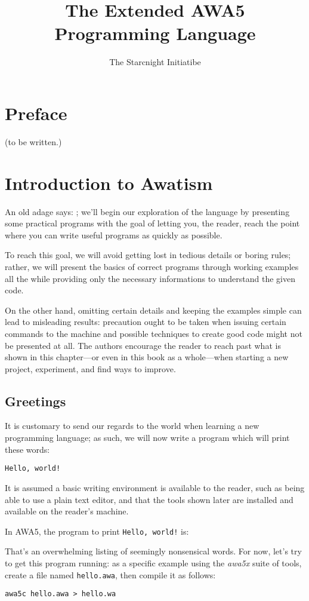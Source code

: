 \documentclass[11pt,a4paper,draft]{book}
\author{The Starcnight Initiatibe}
\title{The Extended AWA5 Programming Language}
\begin{document}
\frontmatter
\tableofcontents

\chapter{Preface}
(to be written.)

\mainmatter
\chapter{Introduction to Awatism}
An old adage says:
;
we'll begin our exploration of the language by presenting some
practical programs with the goal of letting you, the reader, reach the
point where you can write useful programs as quickly as possible.

To reach this goal, we will avoid getting lost in tedious details or
boring rules; rather, we will present the basics of correct programs
through working examples all the while providing only the necessary
informations to understand the given code.

On the other hand, omitting certain details and keeping the examples
simple can lead to misleading results: precaution ought to be taken
when issuing certain commands to the machine and possible techniques
to create good code might not be presented at all. The authors
encourage the reader to reach past what is shown in this chapter---or
even in this book as a whole---when starting a new project,
experiment, and find ways to improve.

\section{Greetings}
It is customary to send our regards to the world when learning a new
programming language; as such, we will now write a program which will
print these words:
\begin{verbatim}
Hello, world!
\end{verbatim}

It is assumed a basic writing environment is available to the reader,
such as being able to use a plain text editor, and that the tools
shown later are installed and available on the reader's machine.

In AWA5, the program to print \verb|Hello, world!| is:


That's an overwhelming listing of seemingly nonsensical words. For
now, let's try to get this program running: as a specific example
using the \emph{awa5x} suite of tools, create a file named
\verb|hello.awa|, then compile it as follows:
\begin{verbatim}
awa5c hello.awa > hello.wa
\end{verbatim}
\end{document}
